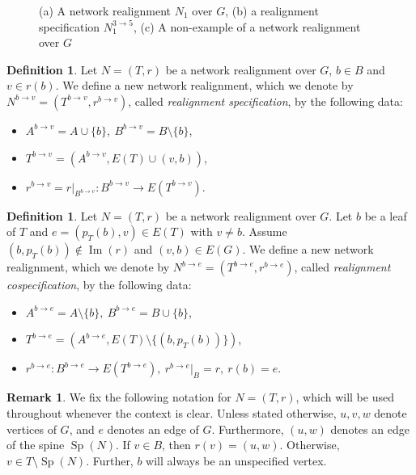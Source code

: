 \documentclass[reqno,dvipsnames]{amsart}
\theoremstyle{plain}
\numberwithin{equation}{section}
\theoremstyle{definition}
\newtheorem{definition}[theorem]{Definition}
\newtheorem{remark}[theorem]{Remark}
\DeclareMathOperator{\Image}{Im}
\DeclareMathOperator{\Sp}{Sp}
\begin{document}
\begin{figure}[tbp]
	\vspace{-3mm}
	\caption{(a) A network realignment $N_1$ over $G$, (b) a realignment specification $N_1^{3\to 5}$, (c) A non-example of a network realignment over $G$}
	\label{fig:NetworkRealignment}
\end{figure}

\begin{definition}
	Let $N=(T,r)$ be a network realignment over $G$, $b\in B$ and $v\in r(b)$. We define a new network realignment, which we denote by $N^{b\to v} = (T^{b\to v},r^{b\to v})$, called \textit{realignment specification}, by the following data:
	\begin{itemize}
		\item $A^{b\to v}= A\cup \{b\}, \> B^{b\to v}= B\setminus \{b\}$,
		\item $T^{b\to v}= (A^{b\to v}, E(T)\cup (v,b))$,
		\item $r^{b\to v}=r\vert_{B^{b\to v}}\colon B^{b\to v} \to E(T^{b\to v})$.
	\end{itemize}
\end{definition}

\begin{definition}
	Let $N=(T,r)$ be a network realignment over $G$. Let $b$ be a leaf of $T$ and $e = (p_T(b), v)\in E(T)$ with $v\neq b$. Assume $(b,p_T(b))\notin \Image(r)$ and $(v,b) \in E(G)$. We define a new network realignment, which we denote by $N^{b\to e} = (T^{b\to e},r^{b\to e})$, called \textit{realignment cospecification}, by the following data:
	\begin{itemize}
		\item $A^{b\to e}= A\setminus \{b\}, \> B^{b\to e}= B\cup \{b\}$,
		\item $T^{b\to e}= (A^{b\to e}, E(T)\setminus \{(b, p_T(b))\})$,
		\item $r^{b\to e}\colon B^{b\to e} \to E(T^{b\to e}), \> r^{b\to e}\vert _B = r, \> r(b) = e$.
	\end{itemize}
\end{definition}

\begin{remark}\label{rem:notation}
	We fix the following notation for $N=(T,r)$, which will be used throughout whenever the context is clear. Unless stated otherwise, $u,v,w$ denote vertices of $G$, and $e$ denotes an edge of $G$. Furthermore, $(u,w)$ denotes an edge of the spine $\Sp(N)$. If $v\in B$, then $r(v)=(u,w)$. Otherwise, $v\in T\setminus \Sp(N)$. Further, $b$ will always be an unspecified vertex.
\end{remark}
\end{document}
